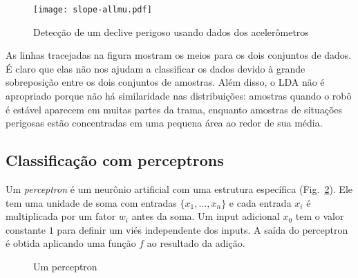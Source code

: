 \begin{figure}
\begin{center}
\texttt{[image: slope-allmu.pdf]}
\end{center}
\caption{Detecção de um declive perigoso usando dados dos acelerômetros}\label{fig.slopemes}
\end{figure}

As linhas tracejadas na figura mostram os meios para os dois conjuntos de dados. É claro que elas não nos ajudam a classificar os dados devido à grande sobreposição entre os dois conjuntos de amostras. Além disso, o LDA não é apropriado porque não há similaridade nas distribuições: amostras quando o robô é estável aparecem em muitas partes da trama, enquanto amostras de situações perigosas estão concentradas em uma pequena área ao redor de sua média.

\subsection{Classificação com perceptrons}

Um \emph{perceptron} é um neurônio artificial com uma estrutura específica (Fig.~\ref{fig.perceptron}). Ele tem uma unidade de soma com entradas $\{x_1,\ldots,x_n\}$ e cada entrada $x_i$ é multiplicada por um fator $w_i$ antes da soma. Um input adicional $x_0$ tem o valor constante $1$ para definir um viés independente dos inputs. A saída do perceptron é obtida aplicando uma função $f$ ao resultado da adição.

\begin{figure}
\begin{center}
\end{center}
\caption{Um perceptron}\label{fig.perceptron}
\end{figure}

